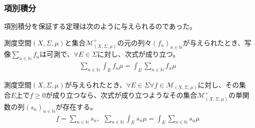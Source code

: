 \documentclass[dvipdfmx]{jsarticle}
\begin{document}
\subsubsection{項別積分}%
項別積分を保証する定理は次のように与えられるのであった。
\begin{thm*}
測度空間$(X,\varSigma,\mu)$と集合$\mathcal{M}_{(X,\varSigma,\mu)}^{+}$の元の列々$\left( f_{n} \right)_{n \in \mathbb{N}}$が与えられたとき、写像$\sum_{n \in \mathbb{N}} f_{n}$は可測で、$\forall E \in \varSigma$に対し、次式が成り立つ。
\begin{align*}
\sum_{n \in \mathbb{N}} {\int_{E} {f_{n}\mu}} = \int_{E} {\sum_{n \in \mathbb{N}} f_{n}\mu}
\end{align*}
\end{thm*}
\begin{thm}\label{4.6.2.9}
測度空間$(X,\varSigma,\mu)$が与えられたとき、$\forall E \in \varSigma\forall f \in \mathcal{M}_{(X,\varSigma,\mu)}$に対し、その集合$E$上で$f \geq 0$が成り立つなら、次式が成り立つようなその集合$\mathcal{M}_{(X,\varSigma,\mu)}^{+}$の単関数の列$\left( s_{n} \right)_{n \in \mathbb{N}}$が存在する。
\begin{align*}
f = \sum_{n \in \mathbb{N}} s_{n},\ \ \sum_{n \in \mathbb{N}} {\int_{E} {s_{n}\mu}} = \int_{E} {\sum_{n \in \mathbb{N}} s_{n}\mu}
\end{align*}
\end{thm}
\end{document}
